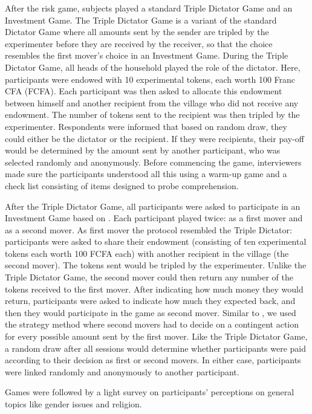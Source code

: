 After the risk game, subjects played a standard Triple Dictator Game and an Investment Game. The Triple Dictator Game is a variant of the standard Dictator Game where all amounts sent by the sender are tripled by the experimenter before they are received by the receiver, so that the choice resembles the first mover's choice in an Investment Game. During the Triple Dictator Game, all heads of the household played the role of the dictator. Here, participants were endowed with 10 experimental tokens, each worth 100 Franc CFA (FCFA). Each participant was then asked to allocate this endowment between himself and another recipient from the village who did not receive any endowment. The number of tokens sent to the recipient was then tripled by the experimenter. Respondents were informed that based on random draw, they could either be the dictator or the recipient. If they were recipients, their pay-off would be determined by the amount sent by another participant, who was selected randomly and anonymously. Before commencing the game, interviewers made sure the participants understood all this using a warm-up game and a check list consisting of items designed to probe comprehension.

After the Triple Dictator Game, all participants were asked to participate in an Investment Game based on \cite{Berg1995}. Each participant played twice: as a first mover and as a second mover. As first mover the protocol resembled the Triple Dictator: participants were asked to share their endowment (consisting of ten experimental tokens each worth 100 FCFA each) with another recipient in the village (the second mover). The tokens sent would be tripled by the experimenter. Unlike the Triple Dictator Game, the second mover could then return any number of the tokens received to the first mover. After indicating how much money they would return, participants were asked to indicate how much they expected back, and then they would participate in the game as second mover. Similar to \cite{Ashraf2006}, we used the strategy method where second movers had to decide on a contingent action for every possible amount sent by the first mover. Like the Triple Dictator Game, a random draw after all sessions would determine whether participants were paid according to their decision as first or second movers. In either case, participants were linked randomly and anonymously to another participant.

Games were followed by a light survey on participants' perceptions on general topics like gender issues and religion.

